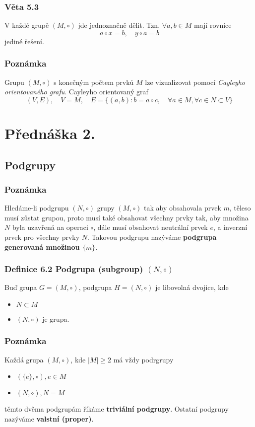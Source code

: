 \documentclass[12pt, letterpaper]{article}
\begin{document}
\subsubsection*{Věta 5.3}
V každé grupě $(M, \circ)$ jde jednoznačně dělit.
 Tzn. $\forall a,b \in M$ mají rovnice \[a \circ x = b, \quad y \circ a = b\] jediné řešení.

\subsubsection*{Poznámka}
Grupu $(M, \circ)$ s konečným počtem prvků $M$ lze vizualizovat pomocí \textit{Cayleyho orientovaného grafu}.
Cayleyho orientovaný graf \[(V,E), \quad V=M, \quad E=\{(a,b): b=a \circ c, \quad \forall a \in M, \forall c \in N \subset V\}\]

\section{Přednáška 2.}

\subsection{Podgrupy}

\subsubsection*{Poznámka}
Hledáme-li podgrupu $(N, \circ)$ grupy $(M, \circ)$ tak aby obsahovala prvek $m$,
těleso musí zůstat grupou, proto musí také obsahovat všechny prvky tak, aby množina $N$ byla uzavřená na operaci $\circ$,
dále musí obsahovat neutrální prvek $e$, a inverzní prvek pro všechny prvky $N$.
Takovou podgrupu nazýváme \textbf{podgrupa generovaná množinou $\{m\}$}.

\subsubsection*{Definice 6.2 Podgrupa (subgroup) $(N, \circ)$}
Buď grupa $G = (M, \circ)$, podgrupa $H = (N, \circ)$ je libovolná dvojice, kde
\begin{itemize}
    \item $N \subset M$
    \item $(N, \circ)$ je grupa.
\end{itemize}

\subsubsection*{Poznámka}
Každá grupa $(M, \circ)$, kde $|M| \geq 2$ má vždy podrgrupy
\begin{itemize}
    \item $(\{e\}, \circ), e \in M$
    \item $(N, \circ), N = M$
\end{itemize}
těmto dvěma podgrupám říkáme \textbf{triviální podgrupy}. Ostatní podgrupy nazýváme \textbf{valstní (proper)}.
\end{document}

